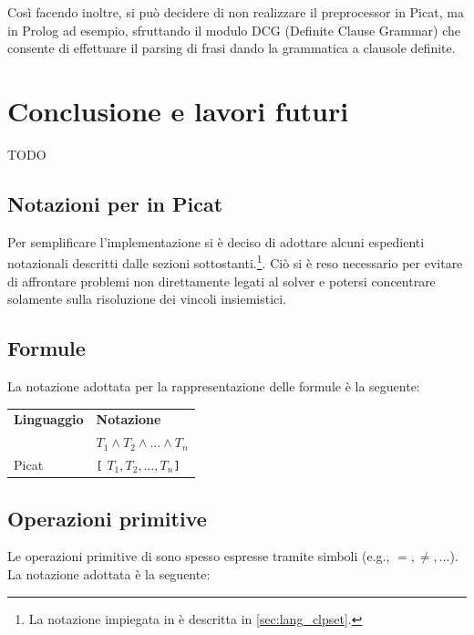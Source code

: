 \documentclass[12pt,a4paper,openright]{book} %
\begin{document}
Così facendo inoltre, si può decidere di non realizzare il preprocessor in Picat, ma in Prolog ad esempio, sfruttando il modulo DCG \cite{MetalevelDCG} (Definite Clause Grammar) che consente di effettuare il parsing di frasi dando la grammatica a clausole definite. 

\chapter{Conclusione e lavori futuri}
TODO


\begin{appendices}

\chapter{Notazioni per \lset{} in Picat}
\label{ch:appendix_lset_picat_notations}

Per semplificare l'implementazione si è deciso di adottare alcuni espedienti notazionali descritti dalle sezioni sottostanti.\footnote{La notazione impiegata in \clpset{} è descritta in \ref{sec:lang_clpset}.}. Ciò si è reso necessario per evitare di affrontare problemi non direttamente legati al solver e potersi concentrare solamente sulla risoluzione dei vincoli insiemistici.

\section{Formule}

La notazione adottata per la rappresentazione delle formule è la seguente:

\begin{table}[H]
\center
\begin{tabular}{ll}
\textbf{Linguaggio} & \textbf{Notazione} \\
\lset{} & $T_1 \land T_2 \land \ldots \land T_n$ \\
Picat & \verb|[| $T_1, T_2, \ldots, T_n$\verb|]| \\
\end{tabular}
\end{table}

\section{Operazioni primitive}

Le operazioni primitive di \clpset{} sono spesso espresse tramite simboli (e.g., $=, \neq, \ldots$). La notazione adottata è la seguente:


\end{appendices}
\end{document}
